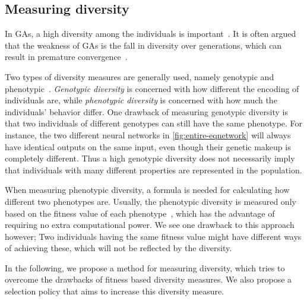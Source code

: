 \subsection{Measuring diversity}
In GAs, a high diversity among the individuals is important~\cite{1266373,Zitzler00comparisonof}. It is often argued that the weakness of GAs is the fall in diversity over generations, which can result in premature convergence~\cite{diaz2007empirical}.

Two types of diversity measures are generally used, namely genotypic and phenotypic~\cite{Nguyen:2006:ASPGP,1250187}. \emph{Genotypic diversity} is concerned with how different the encoding of individuals are, while \emph{phenotypic diversity} is concerned with how much the individuals' behavior differ. One drawback of measuring genotypic diversity is that two individuals of different genotypes can still have the same phenotype. For instance, the two different neural networks in \cref{fig:entire-eqnetwork} will always have identical outputs on the same input, even though their genetic makeup is completely different. Thus a high genotypic diversity does not necessarily imply that individuals with many different properties are represented in the population.
%

%
When measuring phenotypic diversity, a formula is needed for calculating how different two phenotypes are. Usually, the phenotypic diversity is measured only based on the fitness value of each phenotype~\cite{Nguyen:2006:ASPGP}, which has the advantage of requiring no extra computational power.  We see one drawback to this approach however; Two individuals having the same fitness value might have different ways of achieving these, which will not be reflected by the diversity.

In the following, we propose a method for measuring diversity, which tries to overcome the drawbacks of fitness based diversity measures. We also propose a selection policy that aims to increase this diversity measure.

